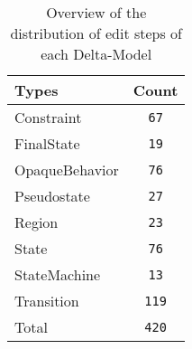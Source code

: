 \begin{table} 
 \center 
 \small 
\begin{tabular}{|l|c|}
\hline
Types & Count\\ 
  \hline 
Constraint & \texttt{67}\\ 
  \hline 
FinalState & \texttt{19}\\ 
  \hline 
OpaqueBehavior & \texttt{76}\\ 
  \hline 
Pseudostate & \texttt{27}\\ 
  \hline 
Region & \texttt{23}\\ 
  \hline 
State & \texttt{76}\\ 
  \hline 
StateMachine & \texttt{13}\\ 
  \hline 
Transition & \texttt{119}\\ 
  \hline 
Total & \texttt{420}\\ 
  \hline 
\end{tabular}
\caption[Overview: Delta-Models]{Overview of the distribution of edit steps of each Delta-Model}
\end{table}

